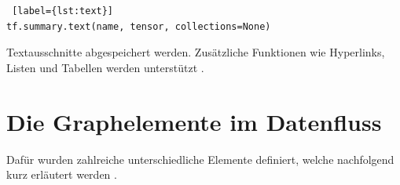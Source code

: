 \begin{minipage}{\linewidth}
\begin{lstlisting} [label={lst:text}]
tf.summary.text(name, tensor, collections=None)
\end{lstlisting}
\end{minipage}
\vspace{0.2cm}

Textausschnitte abgespeichert werden. Zusätzliche Funktionen wie Hyperlinks, Listen und Tabellen werden unterstützt \cite{tensorboard.2017}.





\newpage

\section{Die Graphelemente im Datenfluss}

 Dafür wurden zahlreiche unterschiedliche Elemente definiert, welche nachfolgend kurz erläutert werden \cite{graph_viz}.
\\

